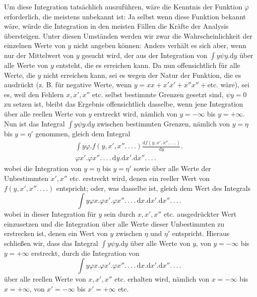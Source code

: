 Um diese Integration tatsächlich auszuführen, wäre die Kenntnis der Funktion \(\varphi\) erforderlich, die meistens unbekannt ist: Ja selbst wenn diese Funktion bekannt wäre, würde die Integration in den meisten Fällen die Kräfte der Analysis übersteigen. Unter diesen Umständen werden wir zwar die Wahrscheinlichkeit der einzelnen Werte von \(y\) nicht angeben können: Anders verhält es sich aber, wenn nur der Mittelwert von \(y\) gesucht wird, der aus der Integration von \(\int y\psi y.\mathrm{d}y\) über alle Werte von \(y\) entsteht, die es erreichen kann. Da nun offensichtlich für alle Werte, die \(y\) nicht erreichen kann, sei es wegen der Natur der Funktion, die es ausdrückt (z. B. für negative Werte, wenn \(y=xx+x'x'+x''x''+\text{etc.}\) wäre), sei es, weil den Fehlern \(x,x',x''\) etc. selbst bestimmte Grenzen gesetzt sind, \(\psi y=0\) zu setzen ist, bleibt das Ergebnis offensichtlich dasselbe, wenn jene Integration über alle reellen Werte von \(y\) erstreckt wird, nämlich von \(y=-\infty\) bis \(y=+\infty\). Nun ist das Integral \(\int y\psi y.\mathrm{d}y\) zwischen bestimmten Grenzen, nämlich von \(y=\eta\) bis \(y=\eta'\) genommen, gleich dem Integral
\[
\begin{aligned}
\int y\varphi.f(y,x',x''\mathord{.}\,\mathord{.}\,\mathord{.}\,\mathord{.})\frac{\mathrm{d}f(y,x',x''\mathord{.}\,\mathord{.}\,\mathord{.}\,\mathord{.})}{\mathrm{d}y}.{}\\
\varphi x'.\varphi x''\mathord{.}\,\mathord{.}\,\mathord{.}\,\mathord{.}\,\mathrm{d}y.\mathrm{d}x'.\mathrm{d}x''\mathord{.}\,\mathord{.}\,\mathord{.}\,\mathord{.}
\end{aligned}
\]
wobei die Integration von \(y=\eta\) bis \(y=\eta'\) sowie über alle Werte der Unbestimmten \(x',x''\) etc. erstreckt wird, denen ein reeller Wert von \(f(y,x',x''\mathord{.}\,\mathord{.}\,\mathord{.}\,\mathord{.})\) entspricht; oder, was dasselbe ist, gleich dem Wert des Integrals
\[
\int y\varphi x.\varphi x'.\varphi x''\mathord{.}\,\mathord{.}\,\mathord{.}\,\mathord{.}\,\mathrm{d}x.\mathrm{d}x'.\mathrm{d}x''\mathord{.}\,\mathord{.}\,\mathord{.}\,\mathord{.}
\]
wobei in dieser Integration für \(y\) sein durch \(x,x',x''\) etc. ausgedrückter Wert einzusetzen und die Integration über alle Werte dieser Unbestimmten zu erstrecken ist, denen ein Wert von \(y\) zwischen \(\eta\) und \(\eta'\) entspricht. Hieraus schließen wir, dass das Integral \(\int y\psi y.\mathrm{d}y\) über alle Werte von \(y\), von \(y=-\infty\) bis \(y=+\infty\) erstreckt, durch die Integration von
\[
\int y\varphi x.\varphi x'.\varphi x''\mathord{.}\,\mathord{.}\,\mathord{.}\,\mathord{.}\,\mathrm{d}x.\mathrm{d}x'.\mathrm{d}x''\mathord{.}\,\mathord{.}\,\mathord{.}\,\mathord{.}
\]
über alle reellen Werte von \(x,x',x''\) etc. erhalten wird, nämlich von \(x=-\infty\) bis \(x=+\infty\), von \(x'=-\infty\) bis \(x'=+\infty\) etc.

\clearpage
